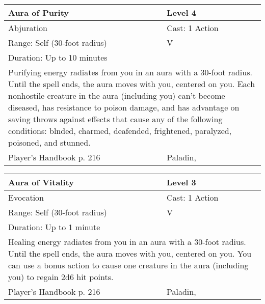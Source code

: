 \documentclass[11pt]{report}
\begin{document}
\begin{table}[H]
	\begin{tabular}{||p{6cm}|p{6cm}||}
		\hline\hline
		\bf{Aura of Purity} & Level 4\\ \hline
		Abjuration & Cast: 1 Action\\ \hline
		Range: Self (30-foot radius) & V\\ \hline
		Duration: Up to 10 minutes & \\ \hline
		\multicolumn{2}{||p{12cm}||}{Purifying energy radiates from you in an aura with a 30-foot radius. 
Until the spell ends, the aura moves with you, centered on you. Each nonhostile creature in the aura (including you) can’t become diseased, has resistance to poison damage, and has advantage on saving throws against effects that cause any of the following conditions: blnded, charmed, deafended, frightened, paralyzed, poisoned, and stunned.}\\ \hline
Player's Handbook p. 216 & Paladin, \\ \hline\hline
	\end{tabular}
\end{table}

\begin{table}[H]
	\begin{tabular}{||p{6cm}|p{6cm}||}
		\hline\hline
		\bf{Aura of Vitality} & Level 3\\ \hline
		Evocation & Cast: 1 Action\\ \hline
		Range: Self (30-foot radius) & V\\ \hline
		Duration: Up to 1 minute & \\ \hline
		\multicolumn{2}{||p{12cm}||}{Healing energy radiates from you in an aura with a 30-foot radius. 
Until the spell ends, the aura moves with you, centered on you. You can use a bonus action to cause one creature in the aura (including you) to regain 2d6 hit points.}\\ \hline
Player's Handbook p. 216 & Paladin, \\ \hline\hline
	\end{tabular}
\end{table}
\end{document}
